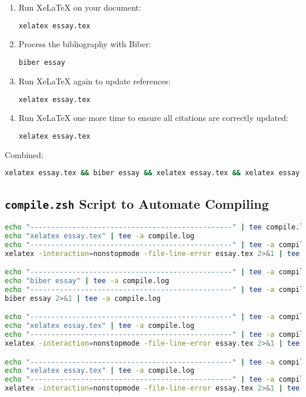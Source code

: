 \documentclass{article}
\begin{document}
\begin{enumerate}
    \item Run XeLaTeX on your document:
          \begin{lstlisting}[language=bash]
xelatex essay.tex
          \end{lstlisting}

    \item Process the bibliography with Biber:
          \begin{lstlisting}[language=bash]
biber essay
          \end{lstlisting}

    \item Run XeLaTeX again to update references:
          \begin{lstlisting}[language=bash]
xelatex essay.tex
          \end{lstlisting}

    \item Run XeLaTeX one more time to ensure all citations are correctly updated:
          \begin{lstlisting}[language=bash]
xelatex essay.tex
          \end{lstlisting}
\end{enumerate}

\noindent Combined:
\begin{lstlisting}[language=bash]
xelatex essay.tex && biber essay && xelatex essay.tex && xelatex essay.tex
\end{lstlisting}

\subsection{\texttt{compile.zsh} Script to Automate Compiling}
\begin{lstlisting}[language=bash]
echo "------------------------------------------------" | tee compile.log
echo "xelatex essay.tex" | tee -a compile.log
echo "------------------------------------------------" | tee -a compile.log
xelatex -interaction=nonstopmode -file-line-error essay.tex 2>&1 | tee -a compile.log

echo "------------------------------------------------" | tee -a compile.log
echo "biber essay" | tee -a compile.log
echo "------------------------------------------------" | tee -a compile.log
biber essay 2>&1 | tee -a compile.log

echo "------------------------------------------------" | tee -a compile.log
echo "xelatex essay.tex" | tee -a compile.log
echo "------------------------------------------------" | tee -a compile.log
xelatex -interaction=nonstopmode -file-line-error essay.tex 2>&1 | tee -a compile.log

echo "------------------------------------------------" | tee -a compile.log
echo "xelatex essay.tex" | tee -a compile.log
echo "------------------------------------------------" | tee -a compile.log
xelatex -interaction=nonstopmode -file-line-error essay.tex 2>&1 | tee -a compile.log
\end{lstlisting}
\end{document}
